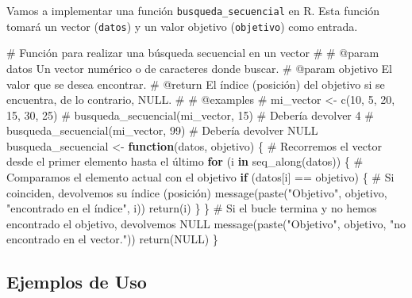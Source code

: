 \documentclass[
  spanish,
  letterpaper,
  DIV=11,
  numbers=noendperiod]{scrreprt}
\newenvironment{Shaded}{\begin{snugshade}}{\end{snugshade}}
\newcommand{\CommentTok}[1]{\textcolor[rgb]{0.37,0.37,0.37}{#1}}
\newcommand{\ConstantTok}[1]{\textcolor[rgb]{0.56,0.35,0.01}{#1}}
\newcommand{\ControlFlowTok}[1]{\textcolor[rgb]{0.00,0.23,0.31}{\textbf{#1}}}
\newcommand{\FunctionTok}[1]{\textcolor[rgb]{0.28,0.35,0.67}{#1}}
\newcommand{\NormalTok}[1]{\textcolor[rgb]{0.00,0.23,0.31}{#1}}
\newcommand{\OtherTok}[1]{\textcolor[rgb]{0.00,0.23,0.31}{#1}}
\newcommand{\SpecialCharTok}[1]{\textcolor[rgb]{0.37,0.37,0.37}{#1}}
\newcommand{\StringTok}[1]{\textcolor[rgb]{0.13,0.47,0.30}{#1}}
\begin{document}
Vamos a implementar una función \texttt{busqueda\_secuencial} en R. Esta
función tomará un vector (\texttt{datos}) y un valor objetivo
(\texttt{objetivo}) como entrada.

\begin{Shaded}
\begin{Highlighting}[]
\CommentTok{\#\textquotesingle{} Función para realizar una búsqueda secuencial en un vector}
\CommentTok{\#\textquotesingle{}}
\CommentTok{\#\textquotesingle{} @param datos Un vector numérico o de caracteres donde buscar.}
\CommentTok{\#\textquotesingle{} @param objetivo El valor que se desea encontrar.}
\CommentTok{\#\textquotesingle{} @return El índice (posición) del objetivo si se encuentra, de lo contrario, NULL.}
\CommentTok{\#\textquotesingle{}}
\CommentTok{\#\textquotesingle{} @examples}
\CommentTok{\#\textquotesingle{} mi\_vector \textless{}{-} c(10, 5, 20, 15, 30, 25)}
\CommentTok{\#\textquotesingle{} busqueda\_secuencial(mi\_vector, 15) \# Debería devolver 4}
\CommentTok{\#\textquotesingle{} busqueda\_secuencial(mi\_vector, 99) \# Debería devolver NULL}
\NormalTok{busqueda\_secuencial }\OtherTok{\textless{}{-}} \ControlFlowTok{function}\NormalTok{(datos, objetivo) \{}
  \CommentTok{\# Recorremos el vector desde el primer elemento hasta el último}
  \ControlFlowTok{for}\NormalTok{ (i }\ControlFlowTok{in} \FunctionTok{seq\_along}\NormalTok{(datos)) \{}
    \CommentTok{\# Comparamos el elemento actual con el objetivo}
    \ControlFlowTok{if}\NormalTok{ (datos[i] }\SpecialCharTok{==}\NormalTok{ objetivo) \{}
      \CommentTok{\# Si coinciden, devolvemos su índice (posición)}
      \FunctionTok{message}\NormalTok{(}\FunctionTok{paste}\NormalTok{(}\StringTok{"Objetivo"}\NormalTok{, objetivo, }\StringTok{"encontrado en el índice"}\NormalTok{, i))}
      \FunctionTok{return}\NormalTok{(i)}
\NormalTok{    \}}
\NormalTok{  \}}
  \CommentTok{\# Si el bucle termina y no hemos encontrado el objetivo, devolvemos NULL}
  \FunctionTok{message}\NormalTok{(}\FunctionTok{paste}\NormalTok{(}\StringTok{"Objetivo"}\NormalTok{, objetivo, }\StringTok{"no encontrado en el vector."}\NormalTok{))}
  \FunctionTok{return}\NormalTok{(}\ConstantTok{NULL}\NormalTok{)}
\NormalTok{\}}
\end{Highlighting}
\end{Shaded}

\subsection{Ejemplos de Uso}\label{ejemplos-de-uso}
\end{document}

